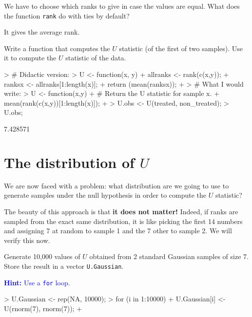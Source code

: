 \documentclass[a4paper]{article}
\theoremstyle{definition}
\begin{document}
\begin{Exercise}
We have to choose which ranks to give in case the values are equal.
What does the function \texttt{rank} do with ties by default?
\end{Exercise}
\begin{Answer}
It gives the average rank.
\end{Answer}

\begin{Exercise}
Write a function that computes the $U$ statistic (of the first
of two samples). Use it to compute the $U$ statistic of the
data.
\end{Exercise}
\begin{Answer}
\begin{Schunk}
\begin{Sinput}
> # Didactic version:
> U <- function(x, y) { 
+    allranks <- rank(c(x,y));
+    ranksx <- allranks[1:length(x)];
+    return (mean(ranksx));
+ }
> # What I would write:
> U <- function(x,y) {
+    # Return the U statistic for sample x.
+    mean(rank(c(x,y))[1:length(x)]);
+ }
> U.obs <- U(treated, non_treated);
> U.obs;
\end{Sinput}
\begin{Soutput}
[1] 7.428571
\end{Soutput}
\end{Schunk}
\end{Answer}


\section{The distribution of $U$}

We are now faced with a problem: what distribution are we going to
use to generate samples under the null hypothesis in order to compute
the $U$ statistic?

The beauty of this approach is that \textbf{it does not matter!}
Indeed, if ranks are sampled from the exact same distribution,
it is like picking the first 14 numbers and assigning 7
at random to sample 1 and the 7 other to sample 2.
We will verify this now.

\begin{Exercise}
Generate 10,000 values of $U$ obtained from 2 standard Gaussian samples
of size 7. Store the result in a vector \texttt{U.Gaussian}.
\par\noindent\textcolor{Blue}{\textbf{Hint:} Use a \texttt{for} loop.}
\end{Exercise}
\begin{Answer}
\begin{Schunk}
\begin{Sinput}
> U.Gaussian <- rep(NA, 10000);
> for (i in 1:10000) {
+    U.Gaussian[i] <- U(rnorm(7), rnorm(7));
+ }
\end{Sinput}
\end{Schunk}
\end{Answer}
\end{document}
